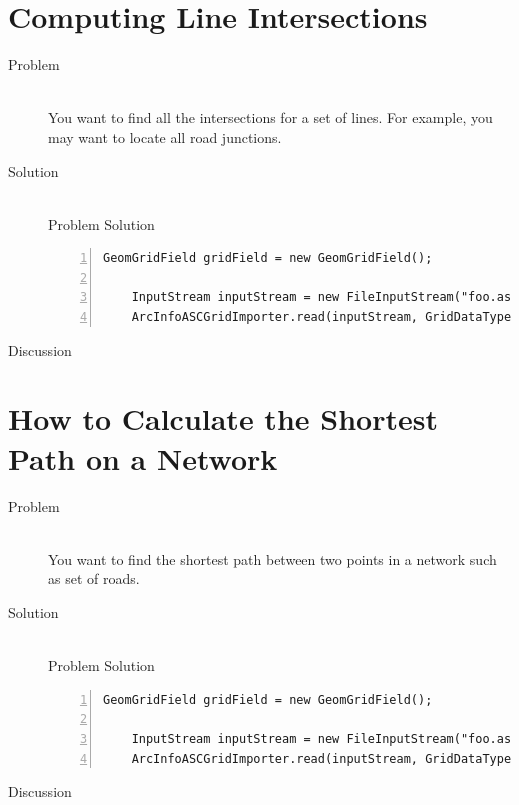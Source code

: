 \documentclass[twoside,10pt]{book}
\begin{document}
\section{Computing Line Intersections}
\label{sec:lineintersection}

\begin{description}
\item[Problem]~\\
You want to find all the intersections for a set of lines.  For
example, you may want to locate all road junctions.

\item[Solution]~\\
Problem Solution
\begin{Verbatim}[frame=lines,framesep=5mm,numbers=left,commandchars=+\[\]]
	GeomGridField gridField = new GeomGridField();
	
	InputStream inputStream = new FileInputStream("foo.asc");
	ArcInfoASCGridImporter.read(inputStream, GridDataType.INTEGER, gridField);
\end{Verbatim}

\item[Discussion ]
\end{description}



\section{How to Calculate the Shortest Path on a Network}
\label{sec:shortestpaths}

\begin{description}
\item[Problem]~\\
You want to find the shortest path between two points in a network
such as set of roads.

\item[Solution]~\\
Problem Solution
\begin{Verbatim}[frame=lines,framesep=5mm,numbers=left,commandchars=+\[\]]
	GeomGridField gridField = new GeomGridField();
	
	InputStream inputStream = new FileInputStream("foo.asc");
	ArcInfoASCGridImporter.read(inputStream, GridDataType.INTEGER, gridField);
\end{Verbatim}

\item[Discussion ]
\end{description}
\end{document}

